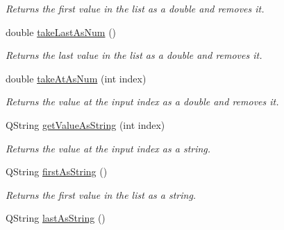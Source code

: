 \begin{DoxyCompactItemize}
\begin{DoxyCompactList}\small\item\em Returns the first value in the list as a double and removes it. \end{DoxyCompactList}\item 
\hypertarget{class_picto_1_1_variable_list_ab487e88d8af20707b1afa9bf06fcf03a}{double \hyperlink{class_picto_1_1_variable_list_ab487e88d8af20707b1afa9bf06fcf03a}{take\-Last\-As\-Num} ()}\label{class_picto_1_1_variable_list_ab487e88d8af20707b1afa9bf06fcf03a}

\begin{DoxyCompactList}\small\item\em Returns the last value in the list as a double and removes it. \end{DoxyCompactList}\item 
\hypertarget{class_picto_1_1_variable_list_a27e5faa6a0bac9cbba882236f375f195}{double \hyperlink{class_picto_1_1_variable_list_a27e5faa6a0bac9cbba882236f375f195}{take\-At\-As\-Num} (int index)}\label{class_picto_1_1_variable_list_a27e5faa6a0bac9cbba882236f375f195}

\begin{DoxyCompactList}\small\item\em Returns the value at the input index as a double and removes it. \end{DoxyCompactList}\item 
\hypertarget{class_picto_1_1_variable_list_abf7f7d841371696626241c1e6a88d7e1}{Q\-String \hyperlink{class_picto_1_1_variable_list_abf7f7d841371696626241c1e6a88d7e1}{get\-Value\-As\-String} (int index)}\label{class_picto_1_1_variable_list_abf7f7d841371696626241c1e6a88d7e1}

\begin{DoxyCompactList}\small\item\em Returns the value at the input index as a string. \end{DoxyCompactList}\item 
\hypertarget{class_picto_1_1_variable_list_afb22f5c70870b095cecd1f54c584b5f9}{Q\-String \hyperlink{class_picto_1_1_variable_list_afb22f5c70870b095cecd1f54c584b5f9}{first\-As\-String} ()}\label{class_picto_1_1_variable_list_afb22f5c70870b095cecd1f54c584b5f9}

\begin{DoxyCompactList}\small\item\em Returns the first value in the list as a string. \end{DoxyCompactList}\item 
\hypertarget{class_picto_1_1_variable_list_a863164951812d766efd0b68d629ebd17}{Q\-String \hyperlink{class_picto_1_1_variable_list_a863164951812d766efd0b68d629ebd17}{last\-As\-String} ()}\label{class_picto_1_1_variable_list_a863164951812d766efd0b68d629ebd17}


\end{DoxyCompactItemize}
